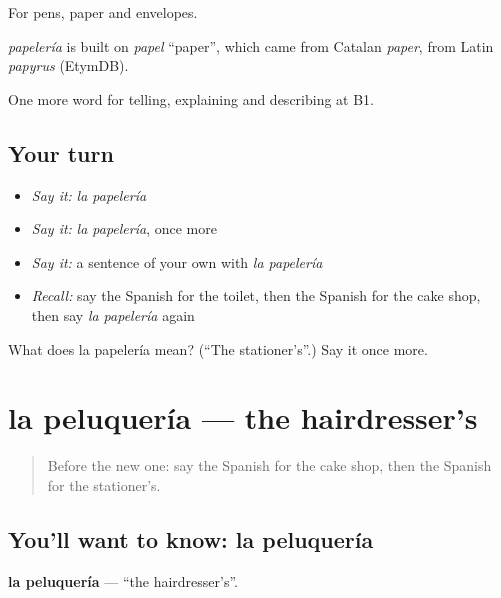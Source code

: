 For pens, paper and envelopes.

\begin{cousinweb}
\emph{papelería} is built on \emph{papel} \textquotedblleft{}paper\textquotedblright{}, which came from Catalan \emph{paper}, from Latin \emph{papyrus} (EtymDB).
\end{cousinweb}

\begin{grammarlens}[title={What you've built}]
One more word for telling, explaining and describing at B1.
\end{grammarlens}

\subsection*{Your turn}
\begin{itemize}
\raggedright
  \item \emph{Say it:} \emph{la papelería}
  \item \emph{Say it:} \emph{la papelería}, once more
  \item \emph{Say it:} a sentence of your own with \emph{la papelería}
  \item \emph{Recall:} say the Spanish for the toilet, then the Spanish for the cake shop, then say \emph{la papelería} again
\end{itemize}

\begin{tcolorbox}[breakable,colback=teal!4,colframe=teal!35!black,title={Before you move on}]
What does la papelería mean? (\textquotedblleft{}The stationer’s\textquotedblright{}.) Say it once more.
\end{tcolorbox}
\section[la peluquería]{la peluquería — the hairdresser’s}

\label{lesson:ES-C680-peluqueria}



\begin{quote}
Before the new one: say the Spanish for the cake shop, then the Spanish for the stationer’s.
\end{quote}

\subsection*{You'll want to know: la peluquería}
\textbf{la peluquería} — \textquotedblleft{}the hairdresser’s\textquotedblright{}.

